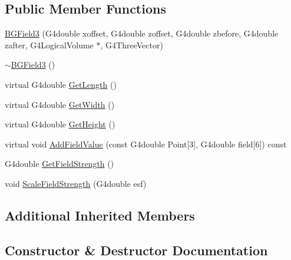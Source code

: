 \subsection*{Public Member Functions}
\begin{DoxyCompactItemize}
\item 
\hyperlink{classBGField3_af114b557b150290f35c94127763d7bab}{B\+G\+Field3} (G4double xoffset, G4double zoffset, G4double zbefore, G4double zafter, G4\+Logical\+Volume $\ast$, G4\+Three\+Vector)
\item 
\hyperlink{classBGField3_a1bfcea77036adc8e62d6c3b06a91997c}{$\sim$\+B\+G\+Field3} ()
\item 
virtual G4double \hyperlink{classBGField3_ae49dd0f301f73bae6fae3d2672823cf8}{Get\+Length} ()
\item 
virtual G4double \hyperlink{classBGField3_a84aaf81a6f511ca8d726c94d52f30336}{Get\+Width} ()
\item 
virtual G4double \hyperlink{classBGField3_a9a3274bc5f550093663680da846ba954}{Get\+Height} ()
\item 
virtual void \hyperlink{classBGField3_a994e1d640acab76909cc82abbd7a8c42}{Add\+Field\+Value} (const G4double Point\mbox{[}3\mbox{]}, G4double field\mbox{[}6\mbox{]}) const 
\item 
G4double \hyperlink{classBGField3_a15e84284be2eae47e39d5c793cefae77}{Get\+Field\+Strength} ()
\item 
void \hyperlink{classBGField3_a5941caec9fb72a08a67d9ccd2ff6c00c}{Scale\+Field\+Strength} (G4double esf)
\end{DoxyCompactItemize}
\subsection*{Additional Inherited Members}


\subsection{Constructor \& Destructor Documentation}
